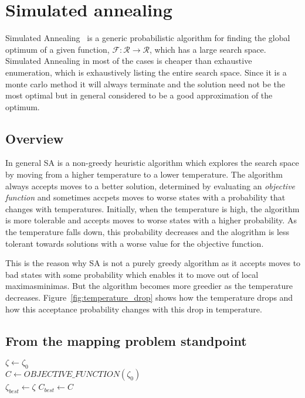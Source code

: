 \section{Simulated annealing}
\label{sec:simulated-annealing}

Simulated Annealing~\cite{kirkpatrick} is a generic probabilistic algorithm for
finding the global optimum of a given function,
$\mathcal{F}:\mathcal{R}\rightarrow\mathcal{R}$, which has a large search space.
Simulated Annealing in most of the cases is cheaper than exhaustive enumeration,
which is exhaustively listing the entire search space. Since it is a monte carlo
method it will always terminate and the solution need not be the most optimal
but in general considered to be a good approximation of the optimum.

\subsection{Overview}

In general SA is a non-greedy heuristic algorithm which explores the search
space by moving from a higher temperature to a lower temperature. The algorithm
always accepts moves to a better solution, determined by evaluating an
\textit{objective function} and sometimes accpets moves to worse states with a
probability that changes with temperatures. Initially, when the temperature is
high, the algorithm is more tolerable and accepts moves to worse states with a
higher probability. As the temperature falls down, this probability decreases
and the alogrithm is less tolerant towards solutions with a worse value for the
objective function.

This is the reason why SA is not a purely greedy algorithm as it accepts moves
to bad states with some probability which enables it to move out of local
maximas\/minimas. But the algorithm becomes more greedier as the temperature
decreases. Figure~\ref{fig:temperature_drop} shows how the temperature drops and
how this acceptance probability changes with this drop in temperature.

\subsection{From the mapping problem standpoint}

\begin{algorithm}[1]
\caption{$Simulated\_Annealing(\zeta_0, \mathcal{T}_0)$}
\label{algo:SA}
\DontPrintSemicolon
{}
$\zeta \leftarrow \zeta_0$ \\
$C \leftarrow OBJECTIVE\_FUNCTION(\zeta_0)$ \\
$\zeta_{best} \leftarrow \zeta$
$C_{best} \leftarrow C$
\end{algorithm}

